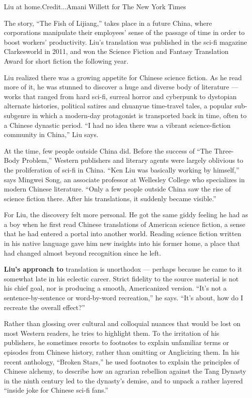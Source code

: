 Liu at home.Credit...Amani Willett for The New York Times

The story, ``The Fish of Lijiang,'' takes place in a future China, where
corporations manipulate their employees' sense of the passage of time in
order to boost workers' productivity. Liu's translation was published in
the sci-fi magazine Clarkesworld in 2011, and won the Science Fiction
and Fantasy Translation Award for short fiction the following year.

Liu realized there was a growing appetite for Chinese science fiction.
As he read more of it, he was stunned to discover a huge and diverse
body of literature --- works that ranged from hard sci-fi, surreal
horror and cyberpunk to dystopian alternate histories, political satires
and chuanyue time-travel tales, a popular sub-subgenre in which a
modern-day protagonist is transported back in time, often to a Chinese
dynastic period. ``I had no idea there was a vibrant science-fiction
community in China,'' Liu says.

At the time, few people outside China did. Before the success of ``The
Three-Body Problem,'' Western publishers and literary agents were
largely oblivious to the proliferation of sci-fi in China. ``Ken Liu was
basically working by himself,'' says Mingwei Song, an associate
professor at Wellesley College who specializes in modern Chinese
literature. ``Only a few people outside China saw the rise of science
fiction there. After his translations, it suddenly became visible.''

For Liu, the discovery felt more personal. He got the same giddy feeling
he had as a boy when he first read Chinese translations of American
science fiction, a sense that he had entered a portal into another
world. Reading science fiction written in his native language gave him
new insights into his former home, a place that had changed almost
beyond recognition since he left.

\textbf{Liu's approach to} translation is unorthodox --- perhaps because
he came to it somewhat late in his eclectic career. Strict fidelity to
the source material is not his chief goal, nor is producing a smooth,
Americanized version. ``It's not a sentence-by-sentence or word-by-word
recreation,'' he says. ``It's about, how do I recreate the overall
effect?''

Rather than glossing over cultural and colloquial nuances that would be
lost on most Western readers, he tries to highlight them. To the
irritation of his publishers, he sometimes resorts to footnotes to
explain unfamiliar terms or episodes from Chinese history, rather than
omitting or Anglicizing them. In his recent anthology, ``Broken Stars,''
he used footnotes to explain the principles of Chinese alchemy, to
describe how an agrarian rebellion against the Tang Dynasty in the ninth
century led to the dynasty's demise, and to unpack a rather layered
``inside joke for Chinese sci-fi fans.''

